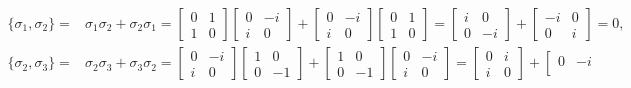 \documentclass[en]{sol-man}
\begin{document}
\begin{pf}
    \begin{align}
        \{\sigma_1,\sigma_2\}=&\sigma_1\sigma_2+\sigma_2\sigma_1=\left[\begin{matrix}
            0&1\\
            1&0
        \end{matrix}\right]\left[\begin{matrix}
            0&-i\\
            i&0
        \end{matrix}\right]+\left[\begin{matrix}
            0&-i\\
            i&0
        \end{matrix}\right]\left[\begin{matrix}
            0&1\\
            1&0
        \end{matrix}\right]=\left[\begin{matrix}
            i&0\\
            0&-i
        \end{matrix}\right]+\left[\begin{matrix}
            -i&0\\
            0&i
        \end{matrix}\right]=0,\\
        \{\sigma_2,\sigma_3\}=&\sigma_2\sigma_3+\sigma_3\sigma_2=\left[\begin{matrix}
            0&-i\\
            i&0
        \end{matrix}\right]\left[\begin{matrix}
            1&0\\
            0&-1
        \end{matrix}\right]+\left[\begin{matrix}
            1&0\\
            0&-1
        \end{matrix}\right]\left[\begin{matrix}
            0&-i\\
            i&0
        \end{matrix}\right]=\left[\begin{matrix}
            0&i\\
            i&0
        \end{matrix}\right]+\left[\begin{matrix}
            0&-i\\

\end{matrix}
\end{align}
\end{pf}
\end{document}

